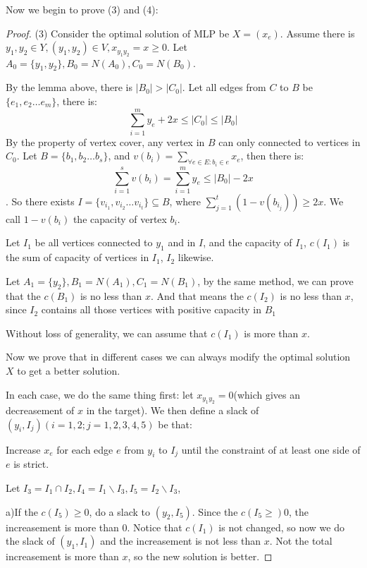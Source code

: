     Now we begin to prove (3) and (4): 

    \begin{proof}
    (3) Consider the optimal solution of MLP be $X=(x_e)$. Assume there is 
    $y_1,y_2\in Y, (y_1,y_2)\in V,x_{y_1y_2}=x\geq 0$. Let $A_0=\{y_1,y_2\}, B_0=N(A_0), C_0=N(B_0)$. 
    
    By the lemma above, there is $|B_0|>|C_0|$. Let all edges from $C$ to $B$ be $\{e_1,e_2\dots e_m\}$, 
    there is: 
    $$\sum_{i=1}^m y_e+2x\leq |C_0|\leq |B_0|$$
    By the property of vertex cover, any vertex in $B$ can only connected to vertices in $C_0$. 
    Let $B=\{b_1,b_2\dots b_s\}$, and $v(b_i)=\sum_{\forall e\in E:b_i\in e}x_e$, then there is: 
    $$\sum_{i=1}^s v(b_i)=\sum_{i=1}^m y_e\leq |B_0|-2x$$. 
    So there exists $I=\{v_{i_1}, v_{i_2}\dots v_{i_t}\}\subseteq B$, where $\sum_{j=1}^t (1-v(b_{i_j}))\geq 2x$. 
    We call $1-v(b_i)$ the capacity of vertex $b_i$. 
    
    Let $I_1$ be all vertices connected to $y_1$ and in $I$, 
    and the capacity of $I_1$, $c(I_1)$ is the sum of capacity of vertices in $I_1$, $I_2$ likewise. 

    Let $A_1=\{y_2\},B_1=N(A_1),C_1=N(B_1)$, by the same method, we can prove that the $c(B_1)$ is no less than $x$. 
    And that means the $c(I_2)$ is no less than $x$, since $I_2$ contains all those vertices with positive capacity in $B_1$

    Without loss of generality, we can assume that $c(I_1)$ is more than $x$. 

    Now we prove that in different cases we can always modify the optimal solution $X$ to get a better solution. 

    In each case, we do the same thing first: let $x_{y_1y_2}=0$(which gives an decreasement of $x$ in the target). 
    We then define a slack of $(y_i,I_j)(i=1,2;j=1,2,3,4,5)$ be that: 

    Increase $x_e$ for each edge $e$ from $y_i$ to $I_j$ until the constraint of at least one side of $e$ is strict. 

    Let $I_3=I_1\cap I_2, I_4=I_1\backslash I_3, I_5=I_2\backslash I_3$, 
    
    a)If the $c(I_5)\geq 0$, do a slack to $(y_2,I_5)$. 
    Since the $c(I_5\geq )0$, the increasement is more than $0$. 
    Notice that $c(I_1)$ is not changed, so now we do the slack of $(y_1,I_1)$ and the increasement is not less than $x$. 
    Not the total increasement is more than $x$, so the new solution is better. 


\end{proof}
